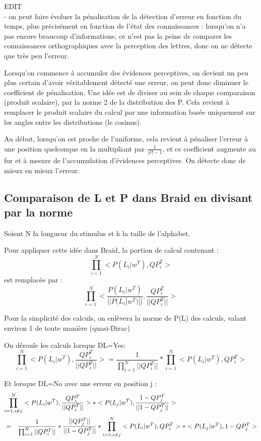 \documentclass{article}
\begin{document}
  EDIT\\
- on peut faire évoluer la pénalisation de la détection d'erreur en fonction du temps, plus précisément en fonction de l'état des connaissances : lorsqu'on n'a pas encore beaucoup d'informations, ce n'est pas la peine de comparer les connaissances orthographiques avec la perception des lettres, donc on ne détecte que très peu l'erreur. 

Lorsqu'on commence à accumuler des évidences perceptives, on devient un peu plus certain d'avoir véritablement détecté une erreur, on peut donc diminuer le coefficient de pénalisation.
Une idée est de diviser au sein de chaque comparaison (produit scalaire), par la norme 2 de la distribution des P. Cela revient à remplacer le produit scalaire du calcul par une information basée uniquement sur les angles entre les distributions (le cosinus).

Au début, lorsqu'on est proche de l'uniforme, cela revient à pénaliser l'erreur à une position quelconque en la multipliant par $\frac{1}{|P|-1}$, et ce coefficient augmente au fur et à mesure de l'accumulation d'évidences perceptives. On détecte donc de mieux en mieux l'erreur.

  

  \subsection{Comparaison de L et P dans Braid en divisant par la norme}
  
  Soient N la longueur du stimulus et k la taille de l'alphabet.
  
  Pour appliquer cette idée dans Braid, la portion de calcul contenant :
 $$ \prod_{i=1}^{N} <P(L_i|w^T),QP_i^T> $$ est remplacée par :
 $$ \prod_{i=1}^{N} <\frac{P(L_i|w^T)}{||P(L_i|w^T)||},\frac{QP_i^T}{||QP_i^T||}>$$
 
 Pour la simplicité des calculs, on enlèvera la norme de P(L) des calculs, valant environ 1 de toute manière (quasi-Dirac)
 
 On déroule les calculs lorsque DL=Yes:
  $$ \prod_{i=1}^{N} <P(L_i|w^T),\frac{QP_i^T}{||QP_i^T||}> = \frac{1}{\prod_{i=1}^{N} ||QP_i^T||} * \prod_{i=1}^{N} <P(L_i|w^T),QP_i^T> $$
  
  Et lorsque DL=No avec une erreur en position j :
\begin{eqnarray}
\lefteqn{\prod_{i=1,i \neq j}^{N} <P(L_i|w^T),\frac{QP_i^T}{||QP_i^T||}> * <P(L_j|w^T),\frac{1-QP_j^T}{||1-QP_j^T||}> }\\
& = &\frac{1}{\prod_{i=1}^{N} ||QP_i^T||}*\frac{||QP_j^T|| }{||1-QP_j^T||} * \prod_{i=1,i \neq j}^{N} <P(L_i|w^T),QP_i^T>* <P(L_j|w^T),1-QP_j^T>
\end{eqnarray}
     
\end{document}
